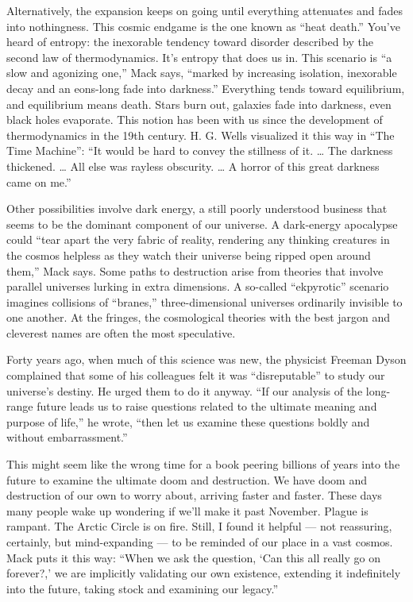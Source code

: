 Alternatively, the expansion keeps on going until everything attenuates
and fades into nothingness. This cosmic endgame is the one known as
``heat death.'' You've heard of entropy: the inexorable tendency toward
disorder described by the second law of thermodynamics. It's entropy
that does us in. This scenario is ``a slow and agonizing one,'' Mack
says, ``marked by increasing isolation, inexorable decay and an
eons-long fade into darkness.'' Everything tends toward equilibrium, and
equilibrium means death. Stars burn out, galaxies fade into darkness,
even black holes evaporate. This notion has been with us since the
development of thermodynamics in the 19th century. H. G. Wells
visualized it this way in ``The Time Machine'': ``It would be hard to
convey the stillness of it. \ldots{} The darkness thickened. \ldots{}
All else was rayless obscurity. \ldots{} A horror of this great darkness
came on me.''

Other possibilities involve dark energy, a still poorly understood
business that seems to be the dominant component of our universe. A
dark-energy apocalypse could ``tear apart the very fabric of reality,
rendering any thinking creatures in the cosmos helpless as they watch
their universe being ripped open around them,'' Mack says. Some paths to
destruction arise from theories that involve parallel universes lurking
in extra dimensions. A so-called ``ekpyrotic'' scenario imagines
collisions of ``branes,'' three-dimensional universes ordinarily
invisible to one another. At the fringes, the cosmological theories with
the best jargon and cleverest names are often the most speculative.

Forty years ago, when much of this science was new, the physicist
Freeman Dyson complained that some of his colleagues felt it was
``disreputable'' to study our universe's destiny. He urged them to do it
anyway. ``If our analysis of the long-range future leads us to raise
questions related to the ultimate meaning and purpose of life,'' he
wrote, ``then let us examine these questions boldly and without
embarrassment.''

This might seem like the wrong time for a book peering billions of years
into the future to examine the ultimate doom and destruction. We have
doom and destruction of our own to worry about, arriving faster and
faster. These days many people wake up wondering if we'll make it past
November. Plague is rampant. The Arctic Circle is on fire. Still, I
found it helpful --- not reassuring, certainly, but mind-expanding ---
to be reminded of our place in a vast cosmos. Mack puts it this way:
``When we ask the question, `Can this all really go on forever?,' we are
implicitly validating our own existence, extending it indefinitely into
the future, taking stock and examining our legacy.''

